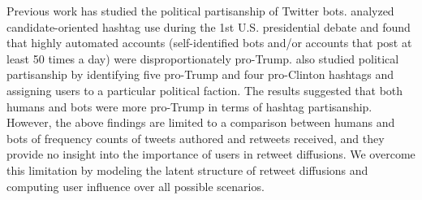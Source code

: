 Previous work has studied the political partisanship of Twitter bots.
\citet{Kollanyi.2016.presidentialdebate} analyzed candidate-oriented hashtag use during the 1st U.S. presidential debate and found that highly automated accounts (self-identified bots and/or accounts that post at least 50 times a day) were disproportionately pro-Trump.
\citet{FM7090} also studied political partisanship by identifying five pro-Trump and four pro-Clinton hashtags and assigning users to a particular political faction.
The results suggested that both humans and bots were more pro-Trump in terms of hashtag partisanship.
However, the above findings are limited to a comparison between humans and bots of frequency counts of tweets authored and retweets received, and they provide no insight into the importance of users in retweet diffusions. 
We overcome this limitation by modeling the latent structure of retweet diffusions and computing user influence over all possible scenarios.




